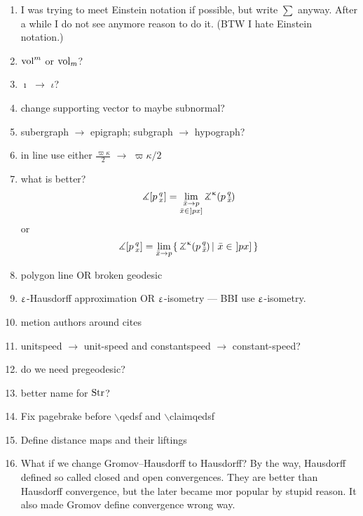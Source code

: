 \begin{enumerate}
\item I was trying to meet Einstein notation if possible, but write $\sum$ anyway.
After a while I do not see anymore reason to do it. (BTW I  hate Einstein notation.)

\item $\mathop{\rm vol}\nolimits^m$ or $\mathop{\rm vol}\nolimits_m$?

\item $\imath$ $\to$ $\iota$?

\item change supporting vector to maybe subnormal?

\item subergraph $\to$ epigraph; subgraph $\to$ hypograph? 

\item in line use either $\tfrac{\varpi\kappa}{2}$ $\to$ $\varpi\kappa/2$

\item what is better?
\[\mangle\hinge p q x
=
\lim_{
\substack{
\bar x\to p
\\
\bar x\in\,\l]px\r]}}\angk\kappa p q{\bar x}\]
or 
\[\mangle\hinge p q x
=
\lim_{\bar x\to p}
\set{\angk\kappa p q{\bar x}}{\bar x\in\,\l]px\r]}\]

\item polygon line OR broken geodesic

\item $\upvarepsilon$-Hausdorff approximation OR $\upvarepsilon$-isometry --- BBI use  $\upvarepsilon$-isometry.

\item metion authors around  cites 

\item unitspeed $\to$ unit-speed and constantspeed $\to$ constant-speed?

\item do we need pregeodesic?

\item better name for $\mathop{\rm Str}\nolimits$?

\item Fix pagebrake before $\backslash$qedsf and $\backslash$claimqedsf

\item Define distance maps and their liftings

\item What if we change Gromov--Hausdorff to Hausdorff?
By the way, Hausdorff defined so called closed and open convergences.
They are better than Hausdorff convergence, but the later became mor popular by stupid reason.
It also made Gromov define convergence wrong way.


\end{enumerate}
